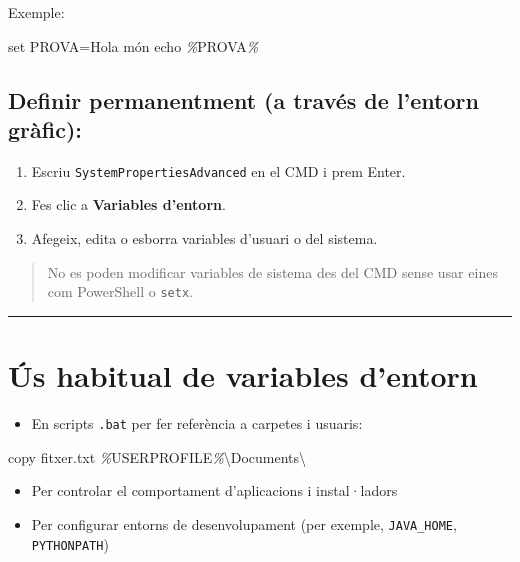 \documentclass[
  a4paper,
]{article}
\newenvironment{Shaded}{\begin{snugshade}}{\end{snugshade}}
\newcommand{\BuiltInTok}[1]{#1}
\newcommand{\NormalTok}[1]{#1}
\newcommand{\PreprocessorTok}[1]{\textcolor[rgb]{0.56,0.35,0.01}{\textit{#1}}}
\newcommand{\VariableTok}[1]{\textcolor[rgb]{0.00,0.00,0.00}{#1}}
\providecommand{\tightlist}{%
  \setlength{\itemsep}{0pt}\setlength{\parskip}{0pt}}
\begin{document}
Exemple:

\begin{Shaded}
\begin{Highlighting}[]
\BuiltInTok{set} \VariableTok{PROVA}\NormalTok{=Hola món}
\BuiltInTok{echo} \PreprocessorTok{\%}\VariableTok{PROVA}\PreprocessorTok{\%}
\end{Highlighting}
\end{Shaded}

\subsection{Definir permanentment (a través de l'entorn
gràfic):}\label{definir-permanentment-a-travuxe9s-de-lentorn-gruxe0fic}

\begin{enumerate}
\def\labelenumi{\arabic{enumi}.}
\tightlist
\item
  Escriu \texttt{SystemPropertiesAdvanced} en el CMD i prem Enter.
\item
  Fes clic a \textbf{Variables d'entorn}.
\item
  Afegeix, edita o esborra variables d'usuari o del sistema.
\end{enumerate}

\begin{quote}
No es poden modificar variables de sistema des del CMD sense usar eines
com PowerShell o \texttt{setx}.
\end{quote}

\begin{center}\rule{0.5\linewidth}{0.5pt}\end{center}

\section{Ús habitual de variables
d'entorn}\label{uxfas-habitual-de-variables-dentorn}

\begin{itemize}
\tightlist
\item
  En scripts \texttt{.bat} per fer referència a carpetes i usuaris:
\end{itemize}

\begin{Shaded}
\begin{Highlighting}[]
\BuiltInTok{copy}\NormalTok{ fitxer.txt }\PreprocessorTok{\%}\VariableTok{USERPROFILE}\PreprocessorTok{\%}\NormalTok{\textbackslash{}Documents\textbackslash{}}
\end{Highlighting}
\end{Shaded}

\begin{itemize}
\tightlist
\item
  Per controlar el comportament d'aplicacions i instal·ladors
\item
  Per configurar entorns de desenvolupament (per exemple,
  \texttt{JAVA\_HOME}, \texttt{PYTHONPATH})
\end{itemize}
\end{document}
